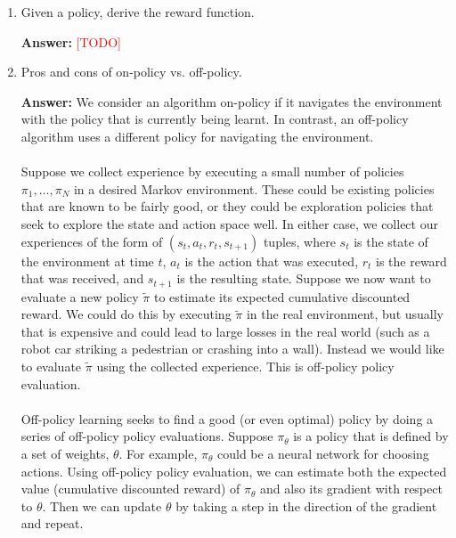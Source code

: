 \documentclass{article}
\newenvironment{QandA}{\begin{enumerate}[label=\arabic*.]}{\end{enumerate}}
\newenvironment{answer}{\par\normalfont \textbf{Answer:}}{}
\newcommand{\todo}{\textcolor{red}{[TODO]}}
\begin{document}
\begin{QandA}
    \begin{figure}[h!]
        \centering
        \texttt{[image: img/alpha-beta-sol.png]}
        \caption{Alpha-beta pruning solution}
        \label{fig:alpha-beta-sol}
    \end{figure}

    \item Given a policy, derive the reward function.
    \begin{answer}
        \todo
    \end{answer}

    \item Pros and cons of on-policy vs. off-policy.
    \begin{answer}
        We consider an algorithm on-policy if it navigates the environment with the policy that is currently being learnt. In contrast, an off-policy algorithm uses a different policy for navigating the environment. \\\\
        Suppose we collect experience by executing a small number of policies $\pi_1, \ldots, \pi_N$ in a desired Markov environment. These could be existing policies that are known to be fairly good, or they could be exploration policies that seek to explore the state and action space well. In either case, we collect our experiences of the form of $(s_t, a_t, r_t, s_{t+1})$ tuples, where $s_t$ is the state of the environment at time $t$, $a_t$ is the action that was executed, $r_t$ is the reward that was received, and $s_{t+1}$ is the resulting state. Suppose we now want to evaluate a new policy $\tilde{\pi}$ to estimate its expected cumulative discounted reward. We could do this by executing $\tilde{\pi}$ in the real environment, but usually that is expensive and could lead to large losses in the real world (such as a robot car striking a pedestrian or crashing into a wall). Instead we would like to evaluate $\tilde{\pi}$ using the collected experience. This is off-policy policy evaluation.\\\\
        Off-policy learning seeks to find a good (or even optimal) policy by doing a series of off-policy policy evaluations. Suppose $\pi_\theta$ is a policy that is defined by a set of weights, $\theta$. For example, $\pi_\theta$ could be a neural network for choosing actions. Using off-policy policy evaluation, we can estimate both the expected value (cumulative discounted reward) of $\pi_\theta$ and also its gradient with respect to $\theta$. Then we can update $\theta$ by taking a step in the direction of the gradient and repeat. \\\\

\end{answer}
\end{QandA}
\end{document}
